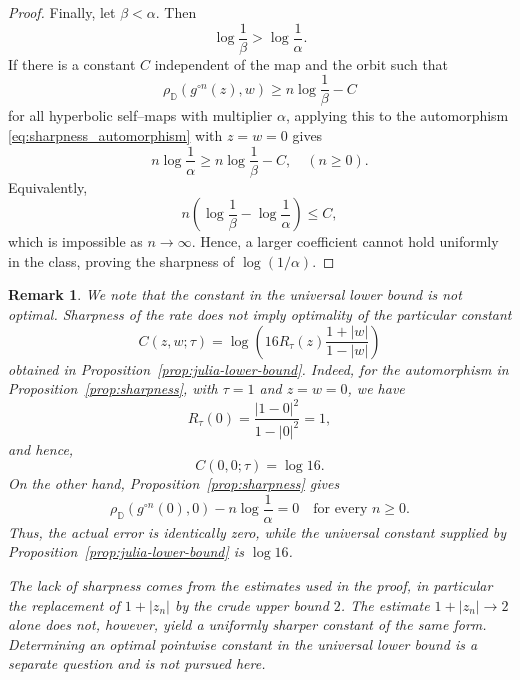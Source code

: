 \documentclass[10pt,a4paper]{amsart}
\numberwithin{equation}{section}
\newtheorem{remark}[equation]{Remark}
\begin{document}
\begin{proof}
Finally, let $\beta<\alpha$. Then
\begin{equation*}
\log\frac{1}{\beta}
>
\log\frac{1}{\alpha}.
\end{equation*}
If there is a constant $C$ independent of the map and the orbit
such that
\begin{equation*}
\rho_{\mathbb{D}}(g^{\circ n}(z),w)
\geq
n\log\frac{1}{\beta}-C
\end{equation*}
for all hyperbolic self--maps with multiplier $\alpha$, applying this
to the automorphism \eqref{eq:sharpness_automorphism} with $z=w=0$ gives
\begin{equation*}
n\log\frac{1}{\alpha}
\geq
n\log\frac{1}{\beta}-C,
\quad(n\geq0).
\end{equation*}
Equivalently,
\begin{equation*}
n\left(
\log\frac{1}{\beta}
-
\log\frac{1}{\alpha}
\right)
\leq C,
\end{equation*}
which is impossible as $n\to\infty$. Hence, a larger coefficient cannot
hold uniformly in the class, proving the sharpness of
$\log(1/\alpha)$.
\end{proof}

\begin{remark}
\label{rem:constant-not-sharp}
We note that the constant in the universal lower bound is not optimal.
Sharpness of the rate does not imply optimality of the particular
constant
\begin{equation*}
C(z,w;\tau)
=
\log\left(
16R_\tau(z)\frac{1+|w|}{1-|w|}
\right)
\end{equation*}
obtained in Proposition~\ref{prop:julia-lower-bound}. Indeed, for the
automorphism in Proposition~\ref{prop:sharpness}, with
$\tau=1$ and $z=w=0$, we have
\begin{equation*}
R_\tau(0)=\frac{|1-0|^2}{1-|0|^2}=1,
\end{equation*}
and hence,
\begin{equation*}
C(0,0;\tau)
=
\log16.
\end{equation*}
On the other hand, Proposition~\ref{prop:sharpness} gives
\begin{equation*}
\rho_{\mathbb{D}}(g^{\circ n}(0),0)
-
n\log\frac{1}{\alpha}
=
0
\quad\text{for every }n\geq0.
\end{equation*}
Thus, the actual error is identically zero, while the universal
constant supplied by Proposition~\ref{prop:julia-lower-bound} is
$\log16$.

The lack of sharpness comes from the estimates used in the proof,
in particular the replacement of $1+|z_n|$ by the crude upper bound
$2$. The estimate $1+|z_n|\to2$ alone does not, however, yield a
uniformly sharper constant of the same form. Determining an optimal
pointwise constant in the universal lower bound is a separate
question and is not pursued here.
\end{remark}
\end{document}
